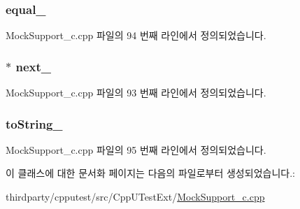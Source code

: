 \subsubsection[{\texorpdfstring{equal\+\_\+}{equal_}}]{ equal\+\_\+}\hypertarget{class_mock_c_function_comparator_node_aacdd74d81e66b1db05ee30f4486342dd}{}\label{class_mock_c_function_comparator_node_aacdd74d81e66b1db05ee30f4486342dd}


Mock\+Support\+\_\+c.\+cpp 파일의 94 번째 라인에서 정의되었습니다.

\subsubsection[{\texorpdfstring{next\+\_\+}{next_}}]{$\ast$ next\+\_\+}\hypertarget{class_mock_c_function_comparator_node_aa3f9159b348e2deda993f12a5b228a35}{}\label{class_mock_c_function_comparator_node_aa3f9159b348e2deda993f12a5b228a35}


Mock\+Support\+\_\+c.\+cpp 파일의 93 번째 라인에서 정의되었습니다.

\subsubsection[{\texorpdfstring{to\+String\+\_\+}{toString_}}]{ to\+String\+\_\+}\hypertarget{class_mock_c_function_comparator_node_ac764fee99195597a2b3a8e2a2d322994}{}\label{class_mock_c_function_comparator_node_ac764fee99195597a2b3a8e2a2d322994}


Mock\+Support\+\_\+c.\+cpp 파일의 95 번째 라인에서 정의되었습니다.



이 클래스에 대한 문서화 페이지는 다음의 파일로부터 생성되었습니다.\+:\begin{DoxyCompactItemize}
\item 
thirdparty/cpputest/src/\+Cpp\+U\+Test\+Ext/\hyperlink{_mock_support__c_8cpp}{Mock\+Support\+\_\+c.\+cpp}\end{DoxyCompactItemize}
